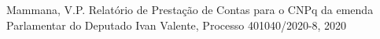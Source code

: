 \documentclass[
12pt,		%
openright,	%
twoside,  %
a4paper,			%
chapter=TITLE,		%
english,			%
french,				%
spanish,			%
brazil				%
]{USPSC-classe/USPSC}
\begin{document}
\begin{flushleft}
\begin{flushleft}
\begin{flushleft}
\begin{flushleft}
\begin{flushleft}
\begin{flushleft}
\begin{flushleft}
\begin{flushleft}
\begin{flushleft}
\begin{flushleft}
[CNPq, 2020b] Mammana, V.P. Relat\'orio de Presta\c{c}\~ao de Contas para o CNPq da emenda Parlamentar do Deputado Ivan Valente, Processo 401040/2020-8, 2020
\end{flushleft}


\end{flushleft}


\end{flushleft}


\end{flushleft}


\end{flushleft}


\end{flushleft}


\end{flushleft}


\end{flushleft}


\end{flushleft}


\end{flushleft}
\end{document}
